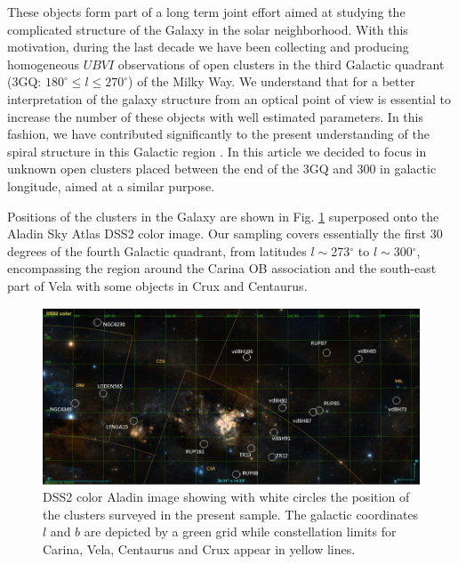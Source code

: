 \documentclass[draft]{aa}
\begin{document}
These objects form part of a long term joint effort aimed at studying the
complicated structure of the Galaxy in the solar neighborhood. With this
motivation, during the last decade we have been collecting and producing
homogeneous $UBVI$ observations of open clusters in the third Galactic quadrant
(3GQ: $180^\circ\leq l \leq270^\circ$) of the Milky Way. We understand that for
a better interpretation of the galaxy structure from an optical point of view
is essential to increase the number of these  objects with well estimated
parameters. In this fashion, we have contributed significantly to the present
understanding of the spiral structure in this Galactic region
\citep{Carraro_2005,Moitinho_2006,Vazquez2008,Carraro_2010}.
In this article we decided to focus in unknown open clusters placed
between the end of the 3GQ and 300 in galactic longitude, aimed at a similar
purpose.

Positions of the clusters in the Galaxy are shown in Fig. \ref{fig1} superposed
onto the Aladin Sky Atlas DSS2 color image. Our sampling covers essentially the
first 30 degrees of the fourth Galactic quadrant, from latitudes
$l\sim$273$^\circ$ to $l\sim$300$^\circ$, encompassing the region around the
Carina OB association and the south-east part of Vela with some objects in Crux
and Centaurus.


\begin{figure}[ht]
    \centering
    \includegraphics[width=\hsize]{../figs/DSS2color.png}
    \caption{DSS2 color Aladin image showing with white circles the position of
    the clusters surveyed in the present sample. The galactic coordinates $l$
    and $b$ are depicted by a green grid while constellation limits for Carina,
    Vela, Centaurus and Crux appear in yellow lines.}
    \label{fig1}
\end{figure}




\end{document}

